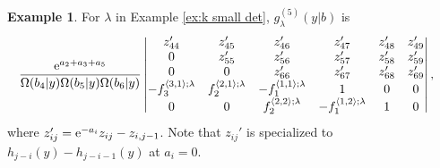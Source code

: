 \documentclass[10pt,a4paper]{amsart}
\numberwithin{equation}{section}
\newcommand{\la}{\lambda}
\theoremstyle{definition}
\newtheorem{Example}[Theorem]{Example}
\begin{document}
\begin{Example}\label{eq:n6_7boxes} For $\la$ in Example
 \ref{ex:k small det}, $g^{(5)}_{\lambda}(y|b)$ is
\[
\begin{aligned}
&
\dfrac{{\rm e}^{a_2+a_3+a_5}}
{\Omega(b_4|y)\Omega(b_5|y)\Omega(b_6|y)}
\begin{vmatrix}
 z'_{44}&z'_{45}&z'_{46}&z'_{47}&z'_{48}&z'_{49}\\
 0&z'_{55}&z'_{56}&z'_{57}&z'_{58}&z'_{59}\\
 0&0&z'_{66}&z'_{67}&z'_{68}&z'_{69}\\
 -f_3^{\langle 3,1\rangle;\la} & f_2^{\langle 2,1\rangle;\la} & -f_1^{\langle 1,1 \rangle;\la} & 1 & 0 & 0\\
 0&0&f_2^{\langle 2,2\rangle;\la}&-f_1^{\langle 1,2 \rangle;\la} & 1 &0
\end{vmatrix},
\end{aligned}
\]
where
$z'_{ij}={\rm e}^{-a_i}z_{ij}-z_{i,j-1}$.
Note that
$z_{ij}'
$ is specialized to
$h_{j-i}(y)-h_{j-i-1}(y)$
at $a_i=0$.
\end{Example}
\end{document}
